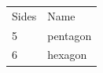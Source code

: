 {        \begin{center}
      
      \label{m39368*uid92}
      
    \noindent
      \tablelasttail{}
      \begin{xtabular*}{\mytablewidth}[t]{|p{10\mystarwidth}|p{10\mystarwidth}|}\hline
    
    
        Sides &
    
    
        Name%
     \tabularnewline{}
    
    
        5 &
    
    
        pentagon%
     \tabularnewline{}
    
    
        6 &
    
    
        hexagon%
     \tabularnewline{}
    

\end{xtabular*}
\end{center}}
